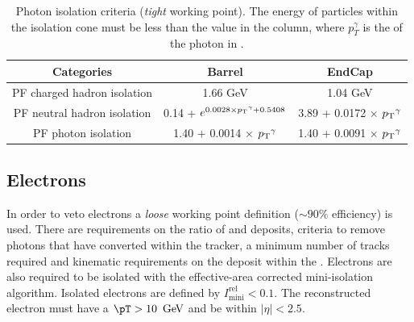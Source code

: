 \begin{table}[ht!]
  \caption{Photon isolation criteria (\emph{tight} working point). The
  energy of particles within the isolation cone must be less than the
  value in the column, where $p_T^{\gamma}$ is the \pT of the photon
  in \gev.\label{tab:photon-id-gamma}}
  \centering
  \footnotesize
  \begin{tabular}{ ccc }
    Categories                    & Barrel                             & EndCap                             \\
    \hline
    PF charged hadron isolation   & 1.66 GeV & 1.04 GeV                          \\
    PF neutral hadron isolation   & 0.14 + $ e^{0.0028 \times {p_{\text T}}^{\gamma} + 0.5408}$  &  3.89 + 0.0172 $\times$ ${p_{\text T}}^{\gamma}$\\
    PF photon isolation           & 1.40 + 0.0014 $\times$ ${p_{\text T}}^{\gamma}$ & 1.40 + 0.0091 $\times$ ${p_{\text T}}^{\gamma}$ \\
  \end{tabular}
  \end{table}

\subsection{Electrons}
\label{sec:electron-id}

In order to veto electrons a \emph{loose} working point definition
($\sim90\%$ efficiency) is used. There are requirements on the
ratio of \HCAL and \ECAL deposits, criteria to remove photons that
have converted within the tracker, a minimum number of tracks required
and kinematic requirements on the deposit within the \ECAL. Electrons
are also required to be isolated with the effective-area
corrected mini-isolation algorithm.  Isolated electrons are defined by
$I^{\textrm{rel}}_{\textrm{mini}} < 0.1$. The reconstructed electron
must have a $\pT>10~\gev$ and be within $|\eta|<2.5$.

